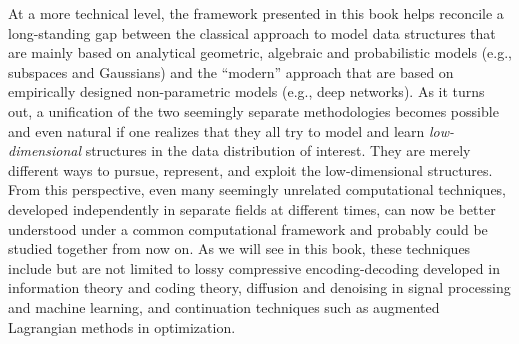 \documentclass[../../book-main.tex]{subfiles}
\begin{document}
At a more technical level, the framework presented in this book helps reconcile a long-standing gap between the classical approach to model data structures that are mainly based on analytical geometric, algebraic and probabilistic models (e.g., subspaces and Gaussians) and the ``modern'' approach that are based on empirically designed non-parametric models (e.g., deep networks). As it turns out, a unification of the two seemingly separate methodologies becomes possible and even natural if one realizes that they all try to model and learn {\em low-dimensional} structures in the data distribution of interest. They are merely different ways to pursue, represent, and exploit the low-dimensional structures. From this perspective, even many seemingly unrelated computational techniques, developed independently in separate fields at different times, can now be better understood under a common computational framework and probably could be studied together from now on. As we will see in this book, these techniques include but are not limited to lossy compressive encoding-decoding developed in information theory and coding theory, diffusion and denoising in signal processing and machine learning, and continuation techniques such as augmented Lagrangian methods in optimization. 
\end{document}

